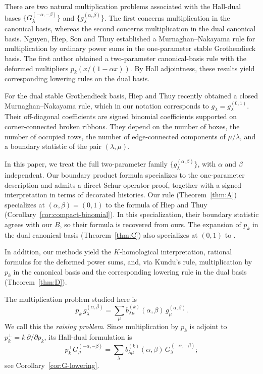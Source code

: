 \documentclass[11pt]{amsart}
\numberwithin{equation}{section}
\theoremstyle{definition}
\theoremstyle{remark}
\begin{document}
There are two natural multiplication problems associated with the
Hall-dual bases
$\{G^{(-\alpha,-\beta)}_\lambda\}$ and
$\{g^{(\alpha,\beta)}_\lambda\}$.
The first concerns multiplication in the canonical basis, whereas
the second concerns multiplication in the dual canonical basis.
Nguyen, Hiep, Son and Thuy \cite{NHST} established a
Murnaghan--Nakayama rule for multiplication by ordinary power sums
in the one-parameter stable Grothendieck basis. 
The first author \cite{Kundu} obtained a two-parameter
canonical-basis rule with the deformed multipliers
$p_k(x/(1-\alpha x))$.
By Hall adjointness, these results yield corresponding lowering
rules on the dual basis.

For the dual stable Grothendieck basis, Hiep and Thuy
\cite[Thm.~2.1]{HiepThuy} recently obtained a closed
Murnaghan--Nakayama rule, which in our notation corresponds to
$g_\lambda=g^{(0,1)}_\lambda$.
Their off-diagonal coefficients are signed binomial coefficients
supported on corner-connected broken ribbons. They depend on the
number of boxes, the number of occupied rows, the number of
edge-connected components of $\mu/\lambda$, and a boundary
statistic of the pair $(\lambda,\mu)$.

In this paper, we treat the full two-parameter family
$\{g^{(\alpha,\beta)}_\lambda\}$, with $\alpha$ and $\beta$
independent. Our boundary product formula specializes to the
one-parameter description and admits a direct Schur-operator
proof, together with a signed interpretation in terms of
decorated histories. Our rule (Theorem~\ref{thm:A}) specializes at
$(\alpha,\beta)=(0,1)$ to the formula of Hiep and Thuy
(Corollary~\ref{cor:compact-binomial}).
In this specialization, their boundary statistic agrees with
our $B$, so their formula is recovered from ours.
The expansion of $p_k$ in the dual canonical basis
(Theorem~\ref{thm:C}) also specializes at $(0,1)$ to
\cite[Cor.~2.5]{HiepThuy}.

In addition, our methods yield the $K$-homological interpretation,
rational formulas for the deformed power sums, and, via Kundu's
rule, multiplication by $p_k$ in the canonical basis and the
corresponding lowering rule in the dual basis
(Theorem~\ref{thm:D}).

The multiplication problem studied here is
\begin{equation}\label{eq:raising-problem}
 p_k\,g^{(\alpha,\beta)}_\lambda
 =\sum_\mu b^{(k)}_{\lambda\mu}(\alpha,\beta)\,
              g^{(\alpha,\beta)}_\mu.
\end{equation}
We call this the \emph{raising problem}.
Since multiplication by $p_k$ is adjoint to
$p_k^\perp=k\,\partial/\partial p_k$, its Hall-dual formulation is
\[
 p_k^\perp G^{(-\alpha,-\beta)}_\mu
 =\sum_\lambda b^{(k)}_{\lambda\mu}(\alpha,\beta)\,
                 G^{(-\alpha,-\beta)}_\lambda;
\]
see Corollary~\ref{cor:G-lowering}.
\end{document}
